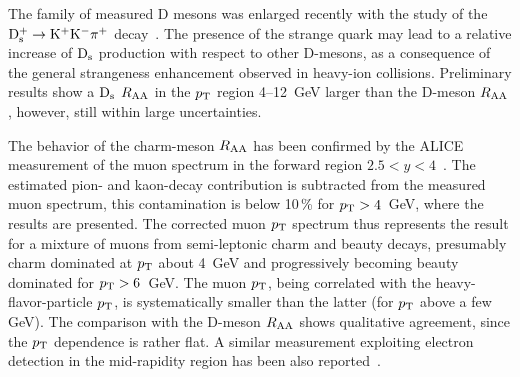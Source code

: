 The family of measured D mesons was enlarged recently with the study of the ${\rm D}_{\rm s}^+ \rightarrow {\rm K}^+{\rm K}^-\pi^+$ decay~\cite{Abelev:2012tca}. The presence of the strange quark may lead to a relative increase of ${\rm D}_{\rm s}$ production with respect to other D-mesons, as a consequence of the general strangeness enhancement observed in heavy-ion collisions. Preliminary results show a ${\rm D}_{\rm s}$ $R_{\rm AA}$ in the $p_{\rm T}$ region 4--12~GeV larger than the D-meson $R_{\rm AA}$, however, still within large uncertainties.

The behavior of the charm-meson $R_{\rm AA}$ has been confirmed by the ALICE measurement of the muon spectrum in the forward region $2.5 < y < 4$~\cite{Abelev:2012qh}. The estimated pion- and kaon-decay contribution is subtracted from the measured muon spectrum, this contamination is below 10\,\% for $p_{\rm T} > 4$~GeV, where the results are presented. The corrected muon $p_{\rm T}$ spectrum thus represents the result for a mixture of muons from semi-leptonic charm and beauty decays, presumably charm dominated at $p_{\rm T}$ about 4~GeV and progressively becoming beauty dominated for $p_{\rm T} > 6$~GeV. 
The muon $p_{\rm T}$, being correlated with the heavy-flavor-particle $p_{\rm T}$, is systematically smaller than the latter (for $p_{\rm T}$ above a few GeV). The comparison with the D-meson $R_{\rm AA}$ shows qualitative agreement, since the $p_{\rm T}$ dependence is rather flat. A similar measurement exploiting electron detection in the mid-rapidity region has been also reported~\cite{Abelev:2012xe}.


